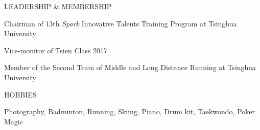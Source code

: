 \documentclass{resume} %
\begin{document}
	\begin{rSection}{LEADERSHIP \& MEMBERSHIP}
		\item Chairman of 13th \textsl{Spark} Innovative Talents Training Program at Tsinghua University
		\item Vice-monitor of Tsien Class 2017
		\item Member of the Second Team of Middle and Long Distance Running at Tsinghua University
	\end{rSection}

	\begin{rSection}{HOBBIES}
		\item Photography, Badminton, Running, Skiing, Piano, Drum kit, Taekwondo, Poker Magic
	\end{rSection}
	
\end{document}
